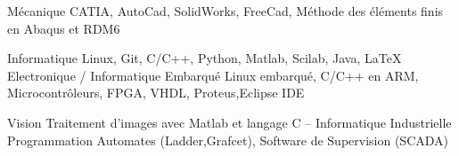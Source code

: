 





\begin{cvskills}
	
\cvskill
{Mécanique} %
{CATIA, AutoCad, SolidWorks, FreeCad, Méthode des éléments finis en Abaqus et RDM6} %

\cvskill
{Informatique} %
{Linux, Git, C/C++, Python, Matlab, Scilab, Java, LaTeX} %
\cvskill
{Electronique / Informatique Embarqué} %
{Linux embarqué, C/C++ en ARM, Microcontrôleurs, FPGA, VHDL, Proteus,Eclipse IDE} %

\cvskill
{Vision} %
{Traitement d'images avec Matlab et langage C} %
--
\cvskill
{Informatique Industrielle} %
{Programmation Automates (Ladder,Grafcet), Software de Supervision (SCADA) } %


\end{cvskills}
